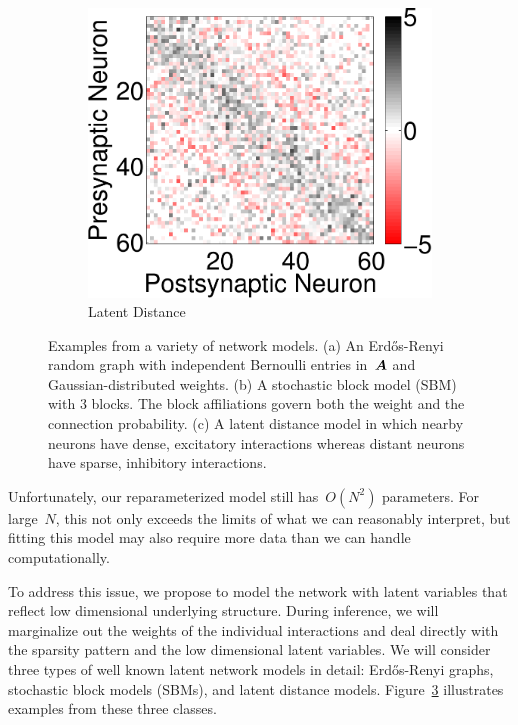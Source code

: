 \documentclass[aos]{imsart} %
\begin{document}
\begin{figure}[t]
\begin{subfigure}[b]{.3\textwidth}
    \label{fig:sbm}
  \end{subfigure}
  \begin{subfigure}[b]{.3\textwidth}
    \centering
    \includegraphics[width=.9\textwidth]{figures/latent_dist}
    \caption{Latent Distance}
    \label{fig:distance}
  \end{subfigure}
  \caption{Examples from a variety of network models. (a) An Erd\H{o}s-Renyi random graph with independent Bernoulli entries in~$\boldsymbol{A}$ and Gaussian-distributed weights. (b) A stochastic block model (SBM) with 3 blocks. The block affiliations govern both the weight and the connection probability. (c) A latent distance model in which nearby neurons have dense, excitatory interactions whereas distant neurons have sparse, inhibitory interactions.}
\label{fig:network_models}
\end{figure}

Unfortunately, our reparameterized model still has~$O(N^2)$ parameters.  For large~$N$, this not only exceeds the limits of what we can reasonably interpret, but fitting this model may also require more data than we can handle computationally.

To address this issue, we propose to model the network with latent variables that reflect low dimensional underlying structure. During inference, we will marginalize out the weights of the individual interactions and deal directly with the sparsity pattern and the low dimensional latent variables. We will consider three types of well known latent network models \citep{Hoff2008, Lloyd2012} in detail: Erd\H{o}s-Renyi graphs, stochastic block models (SBMs), and latent distance models. Figure~\ref{fig:network_models} illustrates examples from these three classes.
\end{document}
